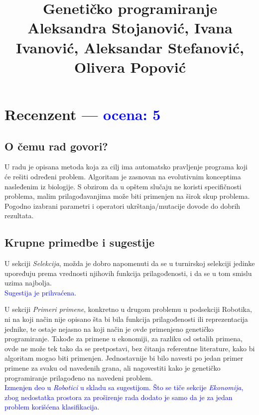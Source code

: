 \documentclass[a4paper]{report}
\newcommand{\odgovor}[1]{\textcolor{blue}{#1}}
\begin{document}
\title{Genetičko programiranje\\ \small{Aleksandra Stojanović, Ivana Ivanović, Aleksandar Stefanović, Olivera Popović}}

\maketitle

\tableofcontents

\chapter{Recenzent \odgovor{--- ocena: 5} }


\section{O čemu rad govori?}
U radu je opisana metoda koja za cilj ima automatsko pravljenje programa koji će rešiti određeni problem. Algoritam je zasnovan na evolutivnim konceptima nasleđenim iz biologije. S obzirom da u opštem slučaju ne koristi specifičnosti problema, malim prilagođavanjima može biti primenjen na širok skup problema.  Pogodno izabrani parametri i operatori ukrštanja/mutacije dovode do dobrih rezultata. 

\section{Krupne primedbe i sugestije}
U sekciji \textit{Selekcija}, možda je dobro napomenuti da se u turnirskoj selekciji jedinke upoređuju prema vrednosti njihovih funkcija prilagođenosti, i da se u tom smislu uzima najbolja.\\  
\odgovor{Sugestija je prihvaćena.}

U sekciji \textit{Primeri primene}, konkretno u drugom problemu u podsekciji Robotika, ni na koji način nije opisano šta bi bila funkcija prilagođenosti ili reprezentacija jednike, te ostaje nejasno na koji način je ovde primenjeno genetičko programiranje. Takođe za primene u ekonomiji, za razliku od ostalih primena, ovde ne može tek tako da se pretpostavi, bez čitanja referentne literature, kako bi algoritam mogao biti primenjen. Jednostavnije bi bilo navesti po jedan primer primene za svaku od navedenih grana, ali nagovestiti kako je genetičko programiranje prilagođeno na navedeni problem.\\
\odgovor{Izmenjen deo u \textit{Robotici} u skladu sa sugestijom. Što se tiče sekcije \textit{Ekonomija}, zbog nedostatka prostora za proširenje rada dodato je samo da je za jedan problem korišćena klasifikacija.}
\end{document}
